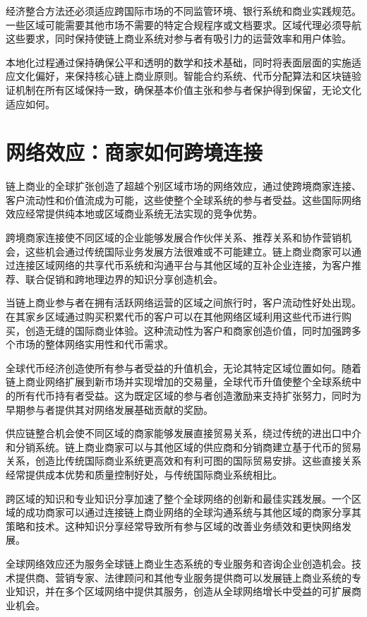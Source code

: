 \documentclass[
  Letterpaper,
]{scrbook}
\begin{document}
经济整合方法还必须适应跨国际市场的不同监管环境、银行系统和商业实践规范。一些区域可能需要其他市场不需要的特定合规程序或文档要求。区域代理必须导航这些要求，同时保持使链上商业系统对参与者有吸引力的运营效率和用户体验。

本地化过程通过保持确保公平和透明的数学和技术基础，同时将表面层面的实施适应文化偏好，来保持核心链上商业原则。智能合约系统、代币分配算法和区块链验证机制在所有区域保持一致，确保基本价值主张和参与者保护得到保留，无论文化适应如何。

\section{网络效应：商家如何跨境连接}\label{ux7f51ux7edcux6548ux5e94ux5546ux5bb6ux5982ux4f55ux8de8ux5883ux8fdeux63a5}

链上商业的全球扩张创造了超越个别区域市场的网络效应，通过使跨境商家连接、客户流动性和价值流成为可能，这些使整个全球系统的参与者受益。这些国际网络效应经常提供纯本地或区域商业系统无法实现的竞争优势。

跨境商家连接使不同区域的企业能够发展合作伙伴关系、推荐关系和协作营销机会，这些机会通过传统国际业务发展方法很难或不可能建立。链上商业商家可以通过连接区域网络的共享代币系统和沟通平台与其他区域的互补企业连接，为客户推荐、联合促销和跨地理边界的知识分享创造机会。

当链上商业参与者在拥有活跃网络运营的区域之间旅行时，客户流动性好处出现。在其家乡区域通过购买积累代币的客户可以在其他网络区域利用这些代币进行购买，创造无缝的国际商业体验。这种流动性为客户和商家创造价值，同时加强跨多个市场的整体网络实用性和代币需求。

全球代币经济创造使所有参与者受益的升值机会，无论其特定区域位置如何。随着链上商业网络扩展到新市场并实现增加的交易量，全球代币升值使整个全球系统中的所有代币持有者受益。这为既定区域的参与者创造激励来支持扩张努力，同时为早期参与者提供其对网络发展基础贡献的奖励。

供应链整合机会使不同区域的商家能够发展直接贸易关系，绕过传统的进出口中介和分销系统。链上商业商家可以与其他区域的供应商和分销商建立基于代币的贸易关系，创造比传统国际商业系统更高效和有利可图的国际贸易安排。这些直接关系经常提供成本优势和质量控制好处，与传统国际商业系统相比。

跨区域的知识和专业知识分享加速了整个全球网络的创新和最佳实践发展。一个区域的成功商家可以通过连接链上商业网络的全球沟通系统与其他区域的商家分享其策略和技术。这种知识分享经常导致所有参与区域的改善业务绩效和更快网络发展。

全球网络效应还为服务全球链上商业生态系统的专业服务和咨询企业创造机会。技术提供商、营销专家、法律顾问和其他专业服务提供商可以发展链上商业系统的专业知识，并在多个区域网络中提供其服务，创造从全球网络增长中受益的可扩展商业机会。
\end{document}
